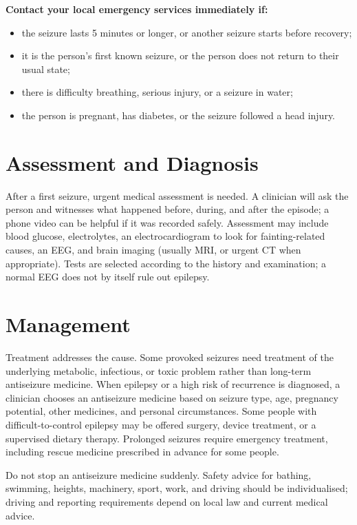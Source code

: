\textbf{Contact your local emergency services immediately if:}
\begin{itemize}
    \item the seizure lasts 5 minutes or longer, or another seizure starts before recovery;
    \item it is the person's first known seizure, or the person does not return to their usual state;
    \item there is difficulty breathing, serious injury, or a seizure in water;
    \item the person is pregnant, has diabetes, or the seizure followed a head injury.
\end{itemize}

\section*{Assessment and Diagnosis}
After a first seizure, urgent medical assessment is needed. A clinician will ask the person and witnesses what happened before, during, and after the episode; a phone video can be helpful if it was recorded safely. Assessment may include blood glucose, electrolytes, an electrocardiogram to look for fainting-related causes, an EEG, and brain imaging (usually MRI, or urgent CT when appropriate). Tests are selected according to the history and examination; a normal EEG does not by itself rule out epilepsy.

\section*{Management}
Treatment addresses the cause. Some provoked seizures need treatment of the underlying metabolic, infectious, or toxic problem rather than long-term antiseizure medicine. When epilepsy or a high risk of recurrence is diagnosed, a clinician chooses an antiseizure medicine based on seizure type, age, pregnancy potential, other medicines, and personal circumstances. Some people with difficult-to-control epilepsy may be offered surgery, device treatment, or a supervised dietary therapy. Prolonged seizures require emergency treatment, including rescue medicine prescribed in advance for some people.

Do not stop an antiseizure medicine suddenly. Safety advice for bathing, swimming, heights, machinery, sport, work, and driving should be individualised; driving and reporting requirements depend on local law and current medical advice.

